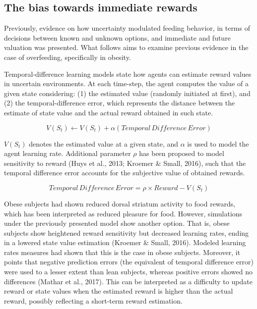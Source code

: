 \documentclass[
]{/home/nicoluarte/Downloads/templates/PNAS-template-main.tex}
\begin{document}
\hypertarget{the-bias-towards-immediate-rewards}{%
\subsection{The bias towards immediate
rewards}\label{the-bias-towards-immediate-rewards}}

Previously, evidence on how uncertainty modulated feeding behavior, in
terms of decisions between known and unknown options, and immediate and
future valuation was presented. What follows aims to examine previous
evidence in the case of overfeeding, specifically in obesity.

Temporal-difference learning models state how agents can estimate reward
values in uncertain environments. At each time-step, the agent computes
the value of a given state considering: (1) the estimated value
(randomly initiated at first), and (2) the temporal-difference error,
which represents the distance between the estimate of state value and
the actual reward obtained in such state.

\begin{equation}
    V(S_t) \leftarrow V(S_t) + \alpha(Temporal \, Difference \, Error)
\end{equation}

\(V(S_t)\) denotes the estimated value at a given state, and \(\alpha\)
is used to model the agent learning rate. Additional parameter \(\rho\)
has been proposed to model sensitivity to reward (Huys et al., 2013;
Kroemer \& Small, 2016), such that the temporal difference error
accounts for the subjective value of obtained rewards.

\begin{equation}
    Temporal \, Difference \, Error = \rho \times Reward - V(S_t)
\end{equation}

Obese subjects had shown reduced dorsal striatum activity to food
rewards, which has been interpreted as reduced pleasure for food.
However, simulations under the previously presented model show another
option. That is, obese subjects show heightened reward sensitivity but
decreased learning rates, ending in a lowered state value estimation
(Kroemer \& Small, 2016). Modeled learning rates measures had shown that
this is the case in obese subjects. Moreover, it points that negative
prediction errors (the equivalent of temporal difference error) were
used to a lesser extent than lean subjects, whereas positive errors
showed no differences (Mathar et al., 2017). This can be interpreted as
a difficulty to update reward or state values when the estimated reward
is higher than the actual reward, possibly reflecting a short-term
reward estimation.
\end{document}
